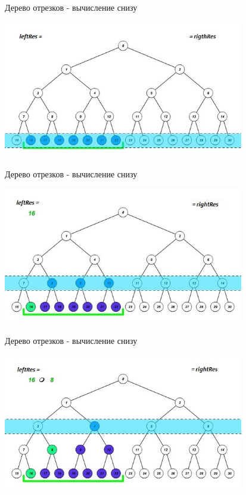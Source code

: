 \documentclass[10pt]{beamer}
\begin{document}
\begin{frame}[fragile]{Дерево отрезков - вычисление снизу}
\begin{center}
    \includegraphics[height=6cm]{Term_2/Source/images/9-up-1.jpg}
\end{center}
\end{frame}

\begin{frame}[fragile]{Дерево отрезков - вычисление снизу}
\begin{center}
    \includegraphics[height=6cm]{Term_2/Source/images/9-up-2.jpg}
\end{center}
\end{frame}

\begin{frame}[fragile]{Дерево отрезков - вычисление снизу}
\begin{center}
    \includegraphics[height=6cm]{Term_2/Source/images/9-up-3.jpg}
\end{center}
\end{frame}
\end{document}
